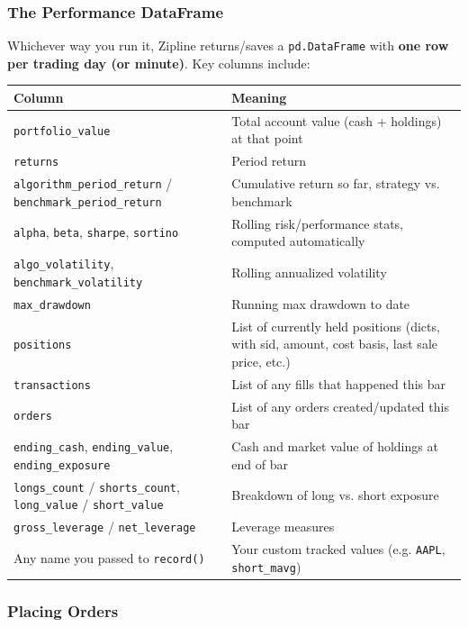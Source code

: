 \documentclass[12pt,openany]{book}
\theoremstyle{definition}
\theoremstyle{remark}
\begin{document}
\subsubsection{The Performance DataFrame}

Whichever way you run it, Zipline returns/saves a \texttt{pd.DataFrame} with \textbf{one row per trading day (or minute)}. Key columns include:

\begin{longtable}{@{}L{0.46\textwidth}L{0.46\textwidth}@{}}
\toprule
\textbf{Column} & \textbf{Meaning} \\
\midrule
\texttt{portfolio\_value} & Total account value (cash + holdings) at that point \\
\texttt{returns} & Period return \\
\texttt{algorithm\_period\_return} / \texttt{benchmark\_period\_return} & Cumulative return so far, strategy vs. benchmark \\
\texttt{alpha}, \texttt{beta}, \texttt{sharpe}, \texttt{sortino} & Rolling risk/performance stats, computed automatically \\
\texttt{algo\_volatility}, \texttt{benchmark\_volatility} & Rolling annualized volatility \\
\texttt{max\_drawdown} & Running max drawdown to date \\
\texttt{positions} & List of currently held positions (dicts, with sid, amount, cost basis, last sale price, etc.) \\
\texttt{transactions} & List of any fills that happened this bar \\
\texttt{orders} & List of any orders created/updated this bar \\
\texttt{ending\_cash}, \texttt{ending\_value}, \texttt{ending\_exposure} & Cash and market value of holdings at end of bar \\
\texttt{longs\_count} / \texttt{shorts\_count}, \texttt{long\_value} / \texttt{short\_value} & Breakdown of long vs. short exposure \\
\texttt{gross\_leverage} / \texttt{net\_leverage} & Leverage measures \\
Any name you passed to \texttt{record()} & Your custom tracked values (e.g. \texttt{AAPL}, \texttt{short\_mavg}) \\
\bottomrule
\end{longtable}
\subsubsection{Placing Orders}
\end{document}
